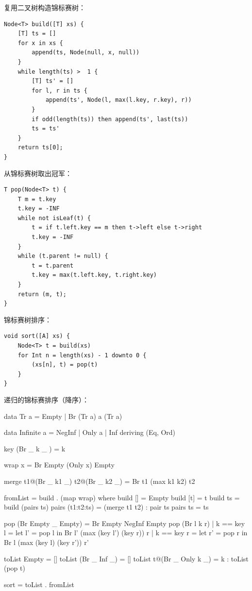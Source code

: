 \documentclass[b5paper]{ctexart}
\begin{document}
复用二叉树构造锦标赛树：

\begin{lstlisting}[language = Bourbaki]
Node<T> build([T] xs) {
    [T] ts = []
    for x in xs {
        append(ts, Node(null, x, null))
    }
    while length(ts) >  1 {
        [T] ts' = []
        for l, r in ts {
            append(ts', Node(l, max(l.key, r.key), r))
        }
        if odd(length(ts)) then append(ts', last(ts))
        ts = ts'
    }
    return ts[0];
}
\end{lstlisting}

从锦标赛树取出冠军：

\begin{lstlisting}[language = Bourbaki]
T pop(Node<T> t) {
    T m = t.key
    t.key = -INF
    while not isLeaf(t) {
        t = if t.left.key == m then t->left else t->right
        t.key = -INF
    }
    while (t.parent != null) {
        t = t.parent
        t.key = max(t.left.key, t.right.key)
    }
    return (m, t);
}
\end{lstlisting}

锦标赛树排序：

\begin{lstlisting}[language = Bourbaki]
void sort([A] xs) {
    Node<T> t = build(xs)
    for Int n = length(xs) - 1 downto 0 {
        (xs[n], t) = pop(t)
    }
}
\end{lstlisting}

递归的锦标赛排序（降序）：

\begin{Haskell}
data Tr a = Empty | Br (Tr a) a (Tr a)

data Infinite a = NegInf | Only a | Inf deriving (Eq, Ord)

key (Br _ k _ ) = k

wrap x = Br Empty (Only x) Empty

merge t1@(Br _ k1 _) t2@(Br _ k2 _) = Br t1 (max k1 k2) t2

fromList = build . (map wrap) where
  build [] = Empty
  build [t] = t
  build ts = build (pairs ts)
  pairs (t1:t2:ts) = (merge t1 t2) : pair ts
  pairs ts = ts

pop (Br Empty _ Empty) = Br Empty NegInf Empty
pop (Br l k r) | k == key l = let l' = pop l in Br l' (max (key l') (key r)) r
               | k == key r = let r' = pop r in Br l (max (key l) (key r')) r'

toList Empty = []
toList (Br _ Inf _) = []
toList t@(Br _ Only k _) = k : toList (pop t)

sort = toList . fromList
\end{Haskell}
\end{document}
